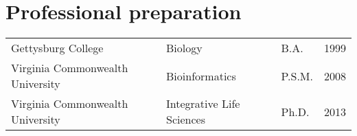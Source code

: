 




\newenvironment{packed_item}{
\begin{itemize}
}{\end{itemize}}




\renewcommand{\thesection}{\Roman{section}}
\renewcommand{\thesubsection}{\thesection.\Roman{subsection}}

\section{Professional preparation}
\begin{center}
	\begin{tabularx}{\textwidth}{lllr}
	Gettysburg College & Biology & B.A. & 1999\\
	Virginia Commonwealth University & Bioinformatics & P.S.M. & 2008 \\
	Virginia Commonwealth University & Integrative Life Sciences & Ph.D. & 2013\\
	 
	\end{tabularx}
\end{center}
	
